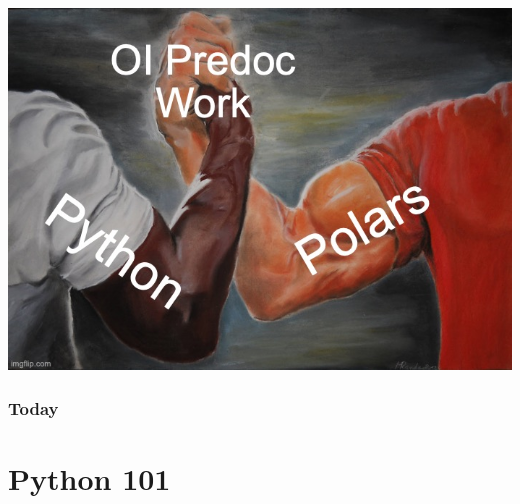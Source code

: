 \documentclass{ali-presentation}
\begin{document}
\begin{frame}[b]
    \centering
    \includegraphics[height = .9\textheight]{figures/handshake.jpg}
\end{frame}

\begin{frame}
    \frametitle{Today}

    \tableofcontents
\end{frame}


\section{Python 101}
\end{document}
